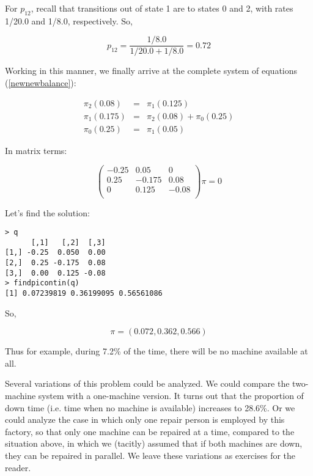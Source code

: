 For $p_{12}$, recall that transitions out of state 1 are to states 0 and
2, with rates 1/20.0 and 1/8.0, respectively.  So,

\begin{equation}
p_{12} = \frac{1/8.0}{1/20.0+1/8.0} = 0.72
\end{equation}

Working in this manner, we finally arrive at the complete system of equations
(\ref{newnewbalance}):

\begin{eqnarray}
\pi_{2}(0.08) & = & \pi_{1}(0.125)\\
\pi_{1}(0.175) & = & \pi_{2}(0.08)+\pi_{0}(0.25)\\
\pi_{0}(0.25) & = & \pi_{1}(0.05)
\end{eqnarray} 

In matrix terms:

\begin{equation}
\left (
\begin{array}{rrr}
-0.25 & 0.05 & 0 \\
0.25 & -0.175 & 0.08 \\
0 & 0.125 & -0.08  \\
\end{array}
\right )
\pi = 0
\end{equation}

Let's find the solution:

\begin{lstlisting}
> q
      [,1]   [,2]  [,3]
[1,] -0.25  0.050  0.00
[2,]  0.25 -0.175  0.08
[3,]  0.00  0.125 -0.08
> findpicontin(q)
[1] 0.07239819 0.36199095 0.56561086
\end{lstlisting}


So,

\begin{equation}
\pi =(0.072,0.362,0.566)
\end{equation}  

Thus for example, during 7.2\% of the time, there will be no machine available
at all.

Several variations of this problem could be analyzed. We could compare
the two-machine system with a one-machine version. It turns out that the
proportion of down time (i.e. time when no machine is available)
increases to 28.6\%. Or we could analyze the case in which only one
repair person is employed by this factory, so that only one machine can
be repaired at a time, compared to the situation above, in which we
(tacitly) assumed that if both machines are down, they can be repaired
in parallel. We leave these variations as exercises for the reader.

